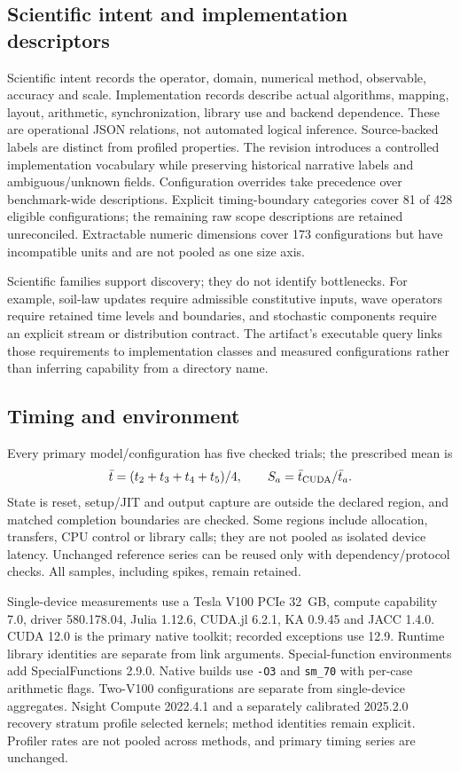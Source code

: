 \subsection{Scientific intent and implementation descriptors}
Scientific intent records the operator, domain, numerical method, observable, accuracy and scale. Implementation records describe actual algorithms, mapping, layout, arithmetic, synchronization, library use and backend dependence. These are operational JSON relations, not automated logical inference. Source-backed labels are distinct from profiled properties. The revision introduces a controlled implementation vocabulary while preserving historical narrative labels and ambiguous/unknown fields. Configuration overrides take precedence over benchmark-wide descriptions. Explicit timing-boundary categories cover 81 of 428 eligible configurations; the remaining raw scope descriptions are retained unreconciled. Extractable numeric dimensions cover 173 configurations but have incompatible units and are not pooled as one size axis.


Scientific families support discovery; they do not identify bottlenecks. For example, soil-law updates require admissible constitutive inputs, wave operators require retained time levels and boundaries, and stochastic components require an explicit stream or distribution contract. The artifact's executable query links those requirements to implementation classes and measured configurations rather than inferring capability from a directory name.

\subsection{Timing and environment}
Every primary model/configuration has five checked trials; the prescribed mean is
\[\bar t=(t_2+t_3+t_4+t_5)/4,\qquad S_a=\bar t_{\rm CUDA}/\bar t_a.\]
State is reset, setup/JIT and output capture are outside the declared region, and matched completion boundaries are checked. Some regions include allocation, transfers, CPU control or library calls; they are not pooled as isolated device latency. Unchanged reference series can be reused only with dependency/protocol checks. All samples, including spikes, remain retained.

Single-device measurements use a Tesla V100 PCIe 32~GB, compute capability 7.0, driver 580.178.04, Julia 1.12.6, CUDA.jl 6.2.1, KA 0.9.45 and JACC 1.4.0. CUDA 12.0 is the primary native toolkit; recorded exceptions use 12.9. Runtime library identities are separate from link arguments. Special-function environments add SpecialFunctions 2.9.0. Native builds use \texttt{-O3} and \texttt{sm\_70} with per-case arithmetic flags. Two-V100 configurations are separate from single-device aggregates. Nsight Compute 2022.4.1 and a separately calibrated 2025.2.0 recovery stratum profile selected kernels; method identities remain explicit. Profiler rates are not pooled across methods, and primary timing series are unchanged.

